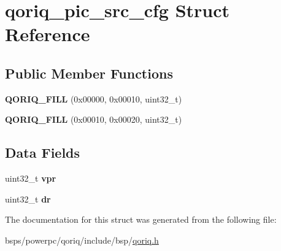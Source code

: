 \hypertarget{structqoriq__pic__src__cfg}{}\section{qoriq\+\_\+pic\+\_\+src\+\_\+cfg Struct Reference}
\label{structqoriq__pic__src__cfg}
\subsection*{Public Member Functions}
\begin{DoxyCompactItemize}
\item 
\mbox{\label{structqoriq__pic__src__cfg_a26e8d650b949ba4d3b7c1bb2e95d21a0}} 
{\bfseries Q\+O\+R\+I\+Q\+\_\+\+F\+I\+LL} (0x00000, 0x00010, uint32\+\_\+t)
\item 
\mbox{\label{structqoriq__pic__src__cfg_a82593453a3cbe5194cbca96a6552d53f}} 
{\bfseries Q\+O\+R\+I\+Q\+\_\+\+F\+I\+LL} (0x00010, 0x00020, uint32\+\_\+t)
\end{DoxyCompactItemize}
\subsection*{Data Fields}
\begin{DoxyCompactItemize}
\item 
\mbox{\label{structqoriq__pic__src__cfg_a0a1a6f8d26dde6f9d0b05005d53907ab}} 
uint32\+\_\+t {\bfseries vpr}
\item 
\mbox{\label{structqoriq__pic__src__cfg_ad502eccc4b9333a6d90c94bc0615e3dd}} 
uint32\+\_\+t {\bfseries dr}
\end{DoxyCompactItemize}


The documentation for this struct was generated from the following file\+:\begin{DoxyCompactItemize}
\item 
bsps/powerpc/qoriq/include/bsp/\mbox{\hyperlink{qoriq_8h}{qoriq.\+h}}\end{DoxyCompactItemize}
